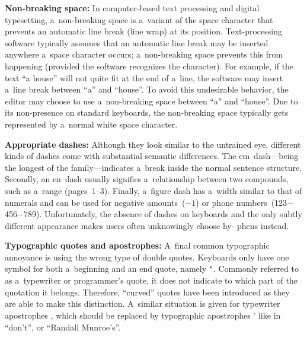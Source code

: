 \documentclass{sig-alternate}
\begin{document}
\textbf{Non-breaking space:} In computer-based text processing and digital typesetting,
a~non-breaking space is a~variant of the space character that prevents an automatic line break (line wrap) at its position.
Text-processing software typically assumes that an automatic line break may be inserted anywhere a~space
character occurs;
a~non-breaking space prevents this from happening (provided the software recognizes the character).
For example, if the text ``a house'' will not quite fit at the end of a~line,
the software may insert a~line break between ``a'' and ``house''.
To avoid this undesirable behavior, the editor may choose to use a~non-breaking space between ``a'' and ``house''.
Due to its non-presence on standard keyboards,
the non-breaking space typically gets represented by a~normal white space character.

\textbf{Appropriate dashes:} Although they look similar to the untrained eye, different kinds of dashes come with\linebreak%
substantial semantic differences.
The em~dash---being the longest of the family---indicates a~break inside the normal sentence structure.
Secondly, an en~dash usually signifies\linebreak%
a~relationship between two compounds, such as a~range (pages~1--3).
Finally, a~figure dash has a~width similar to that of numerals and can be used for negative amounts~($-1$) or phone numbers~(123$-$456$-$789).
Unfortunately, the\linebreak%
absence of dashes on keyboards and the only subtly different\linebreak%
appearance makes users often unknowingly choose hy-\linebreak%
phens instead.

\textbf{Typographic quotes and apostrophes:} A~final common typographic annoyance is using the wrong type of double quotes.
Keyboards only have one symbol for both a~beginning and an end quote, namely \Verb!"!.
Commonly referred to as a~typewriter or programmer's quote, it does not indicate to which part of the quotation it belongs.
Therefore, ``curved'' quotes have been introduced as they are able to make this distinction.
A~similar situation is given for typewriter apostrophes \textquotesingle, which should be replaced by typographic apostrophes ' like in ``don't'', or ``Randall Munroe's''.
\end{document}
